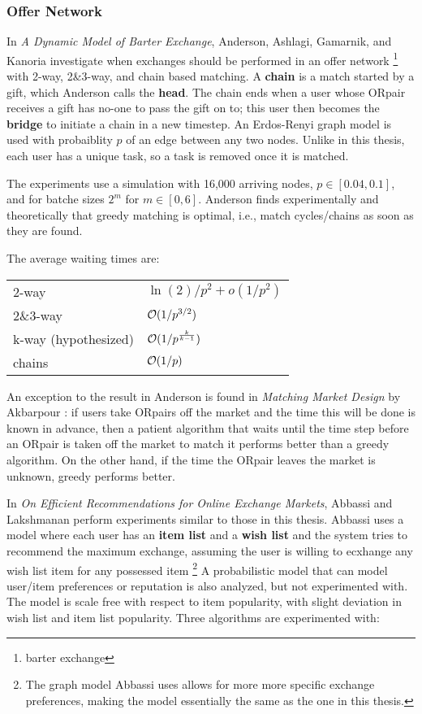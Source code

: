 \documentclass[main.tex]{subfiles}
\begin{document}
\subsubsection{Offer Network}

In \textit{A Dynamic Model of Barter Exchange}, Anderson, Ashlagi, Gamarnik, and Kanoria \cite{And1} investigate when exchanges should be performed in an offer network \footnote{barter exchange} with 2-way, 2\&3-way, and chain based matching. A \textbf{chain} is a match started by a gift, which Anderson calls the \textbf{head}. The chain ends when a user whose ORpair receives a gift has no-one to pass the gift on to; this user then becomes the \textbf{bridge} to initiate a chain in a new timestep. An Erdos-Renyi graph model \cite{Erdos} is used with probaiblity $p$ of an edge between any two nodes. Unlike in this thesis, each user has a unique task, so a task is removed once it is matched.

The experiments use a simulation with 16,000 arriving nodes, $p \in [0.04, 0.1]$, and for batche sizes $2^m$ for $m \in [0,6]$. Anderson finds experimentally and theoretically  that greedy matching is optimal, i.e., match cycles/chains as soon as they are found.

The average waiting times are:
\begin{center}
  \begin{tabular}{| l | l |}
    \hline
    2-way    & $\ln(2)/p^2 + o(1/p^2)$ \\
    2\&3-way & $\mathcal{O}(1/p^{3/2})$ \\
    k-way (hypothesized) & $\mathcal{O}(1/p^{\frac{k}{k-1}})$ \\
    chains   & $\mathcal{O}(1/p)$ \\
    \hline
  \end{tabular}
\end{center}

An exception to the result in Anderson \cite{And1} is found in \textit{Matching Market Design} by Akbarpour \cite{Akb1}: if users take ORpairs off the market and the time this will be done is known in advance, then a patient algorithm that waits until the time step before an ORpair is taken off the market to match it performs better than a greedy algorithm. On the other hand, if the time the ORpair leaves the market is unknown, greedy performs better.

In \textit{On Efficient Recommendations for Online Exchange Markets}, Abbassi and Lakshmanan \cite{Abb1} perform experiments similar to those in this thesis. Abbassi uses a model where each user has an \textbf{item list} and a \textbf{wish list} and the system tries to recommend the maximum exchange, assuming the user is willing to ecxhange any wish list item for any possessed item \footnote{The graph model Abbassi uses allows for more more specific exchange preferences, making the model essentially the same as the one in this thesis.} A probabilistic model that can model user/item preferences or reputation is also analyzed, but not experimented with. The model is scale free with respect to item popularity, with slight deviation in wish list and item list popularity. Three algorithms are experimented with:
\end{document}
